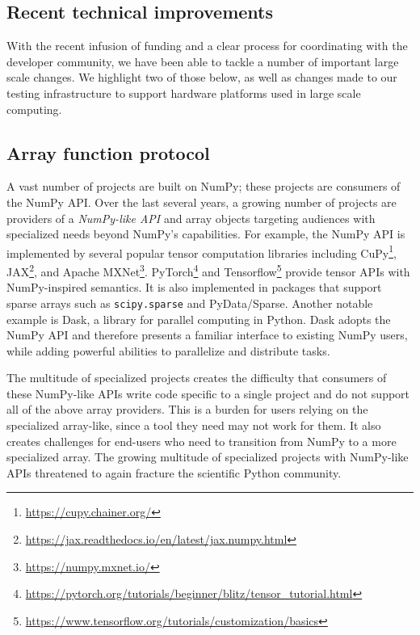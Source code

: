 \subsection*{Recent technical improvements}

With the recent infusion of funding and a clear process for coordinating with
the developer community, we have been able to tackle a number of important
large scale changes.
We highlight two of those below, as well as changes made to our testing
infrastructure to support hardware platforms used in large scale computing.

\subsection*{Array function protocol}

A vast number of projects are built on NumPy;
these projects are consumers of the NumPy API.
Over the last several years, a growing number of projects are providers of
a \emph{NumPy-like API} and array objects targeting audiences with specialized
needs beyond NumPy's capabilities.
For example, the NumPy API is implemented by several popular tensor computation
libraries including CuPy\footnote{\url{https://cupy.chainer.org/}},
JAX\footnote{\url{https://jax.readthedocs.io/en/latest/jax.numpy.html}},
and Apache MXNet\footnote{\url{https://numpy.mxnet.io/}}.
PyTorch\footnote{\url{https://pytorch.org/tutorials/beginner/blitz/tensor\_tutorial.html}}
and Tensorflow\footnote{\url{https://www.tensorflow.org/tutorials/customization/basics}}
provide tensor APIs with NumPy-inspired semantics.
It is also implemented in packages that support sparse arrays
such as \texttt{scipy.sparse} and PyData/Sparse.
Another notable example is Dask, a library for parallel computing in
Python.  Dask adopts the NumPy API and therefore presents a familiar
interface to existing NumPy users, while adding powerful abilities to
parallelize and distribute tasks.

The multitude of specialized projects creates the difficulty that consumers
of these NumPy-like APIs write code specific to a single project and do not support
all of the above array providers.
This is a burden for users relying on the specialized array-like, since
a tool they need may not work for them.
It also creates challenges for end-users who need to transition
from NumPy to a more specialized array.
The growing multitude of specialized projects with NumPy-like APIs threatened
to again fracture the scientific Python community.

